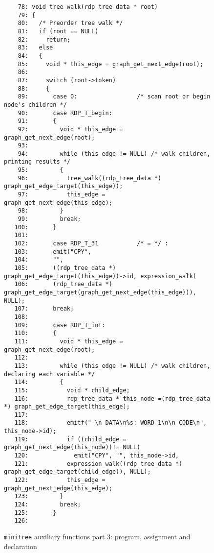 \begin{figure}
\hspace*{-2.5cm}
\footnotesize
\begin{minipage}{30cm}
\begin{verbatim}
    78: void tree_walk(rdp_tree_data * root)
    79: {
    80:   /* Preorder tree walk */
    81:   if (root == NULL)
    82:     return; 
    83:   else
    84:   {
    85:     void * this_edge = graph_get_next_edge(root); 
    86:     
    87:     switch (root->token)
    88:     {
    89:       case 0:                 /* scan root or begin node's children */
    90:       case RDP_T_begin: 
    91:       {
    92:         void * this_edge = graph_get_next_edge(root); 
    93:         
    94:         while (this_edge != NULL) /* walk children, printing results */
    95:         {
    96:           tree_walk((rdp_tree_data *) graph_get_edge_target(this_edge)); 
    97:           this_edge = graph_get_next_edge(this_edge); 
    98:         }
    99:         break; 
   100:       }
   101:       
   102:       case RDP_T_31           /* = */ : 
   103:       emit("CPY", 
   104:       "", 
   105:       ((rdp_tree_data *) graph_get_edge_target(this_edge))->id, expression_walk(
   106:       (rdp_tree_data *) graph_get_edge_target(graph_get_next_edge(this_edge))), NULL); 
   107:       break; 
   108:       
   109:       case RDP_T_int: 
   110:       {
   111:         void * this_edge = graph_get_next_edge(root); 
   112:         
   113:         while (this_edge != NULL) /* walk children, declaring each variable */
   114:         {
   115:           void * child_edge; 
   116:           rdp_tree_data * this_node =(rdp_tree_data *) graph_get_edge_target(this_edge); 
   117:           
   118:           emitf(" \n DATA\n%s: WORD 1\n\n CODE\n", this_node->id); 
   119:           if ((child_edge = graph_get_next_edge(this_node))!= NULL)
   120:             emit("CPY", "", this_node->id, 
   121:           expression_walk((rdp_tree_data *) graph_get_edge_target(child_edge)), NULL); 
   122:           this_edge = graph_get_next_edge(this_edge); 
   123:         }
   124:         break; 
   125:       }
   126:       
\end{verbatim}
\end{minipage}
\caption{{\tt minitree} auxiliary functions part 3: program, assignment and declaration}
\label{mt_aux.c:3}
\end{figure}
